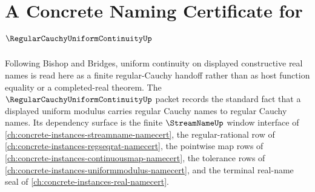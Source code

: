 \chapter{A Concrete Naming Certificate for $\RegularCauchyUniformContinuityUp$}
\label{ch:concrete-instances-regular-cauchy-uniform-continuity-namecert}

Following Bishop and Bridges, uniform continuity on displayed constructive real names is read here as a finite regular-Cauchy handoff rather than as host function equality or a completed-real theorem. The $\RegularCauchyUniformContinuityUp$ packet records the standard fact that a displayed uniform modulus carries regular Cauchy names to regular Cauchy names. Its dependency surface is the finite $\StreamNameUp$ window interface of \autoref{ch:concrete-instances-streamname-namecert}, the regular-rational row of \autoref{ch:concrete-instances-regseqrat-namecert}, the pointwise map rows of \autoref{ch:concrete-instances-continuousmap-namecert}, the tolerance rows of \autoref{ch:concrete-instances-uniformmodulus-namecert}, and the terminal real-name seal of \autoref{ch:concrete-instances-real-namecert}.

